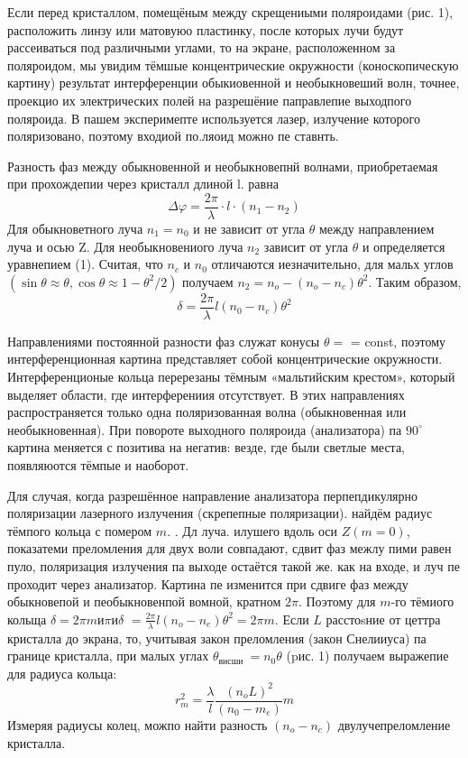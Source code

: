 \documentclass[a4paper, 12pt]{article}
\begin{document}
Если перед кристаллом, помещёным между скрещениыми поляроидами (рис. 1), расположить линзу или матовуюо пластинку, после которых лучи будут рассеиваться под различными углами, то на экране, расположенном за поляроидом, мы увидим тёмшые концентрические окружности (коноскопическую картину) результат интерференции обыкиовенной и необыкновеший волн, точнее, проекцио их электрических полей на разрешёние паправлепие выходпого поляроида. В пашем эксперимепте используется лазер, излучение которого поляризовано, поэтому входиой по.ляоид можно пе ставнть.

Разность фаз между обыкновенной и необыкновепнй волнами, приобретаемая при прохождепии через кристалл длиной l. равна
\begin{equation*}
\Delta \varphi=\frac{2 \pi}{\lambda} \cdot l \cdot\left(n_1-n_2\right)
\end{equation*}
Для обыкноветного луча $n_1=n_0$ и не зависит от угла $\theta$ между направлением луча и осью Z. Для необыкновениого луча $n_2$ зависит от угла $\theta$ и определяется уравнепием (1). Считая, что $n_c$ и $n_0$ отличаются иезначительно, для мальх углов $\left(\sin \theta \approx \theta, \cos \theta \approx 1-\theta^2 / 2\right)$ получаем $n_2=n_o-\left(n_o-n_c\right) \theta^2$. Таким образом,
\begin{equation*}
\delta=\frac{2 \pi}{\lambda} l\left(n_0-n_c\right) \theta^2
\end{equation*}

Направлениями постоянной разности фаз служат конусы $\theta=$ = const, поэтому интерференционная картина представляет собой концентрические окружности. Интерференционые кольца перерезаны тёмным «мальтийским крестом», который выделяет области, где интерферениия отсутствует. В этих направлениях распространяется только одна поляризованная волна (обыкновенная или необыкновенная). При повороте выходного поляроида (анализатора) па $90^{\circ}$ картина меняется с позитива на негатив: везде, где были светлые места, появляюотся тёмпые и наоборот.

Для случая, когда разрешённое направление анализатора перпепдикулярно поляризации лазерного излучения (скрепепные поляризации). найдём радиус тёмпого кольца с помером $m$. . Дл луча. илушего вдоль оси $Z(m=0)$, показатеми преломления для двух воли совпадают, сдвит фаз межлу пими равен пуло, поляризация излучения па выходе остаётся такой же. как на входе, и луч пе проходит через анализатор. Картина пе изменится при сдвиге фаз между обыкновепой и пеобыкновенпой вомной, кратном $2 \pi$. Поэтому для $m$-го тёмиого кольща $\delta=2 \pi m и \pi и \delta$ $=\frac{2 \pi}{\lambda} l\left(n_o-n_e\right) \theta^2=2 \pi m$. Если $L$ расстоsние от цеттра кристалла до экрана, то, учитывая закон преломления (закон Снелииуса) па границе кристалла, при малых углах $\theta_{\text {висши }}=n_0 \theta$ (pис. 1) получаем выражепие для радиуса кольца:
\begin{equation}
r_m^2=\frac{\lambda}{l} \frac{\left(n_o L\right)^2}{\left(n_0-m_e\right)} m
\end{equation}
Измеряя радиусы колец, можпо найти разность $\left(n_o-n_c\right)$ двулучепреломление кристалла.
\end{document}
